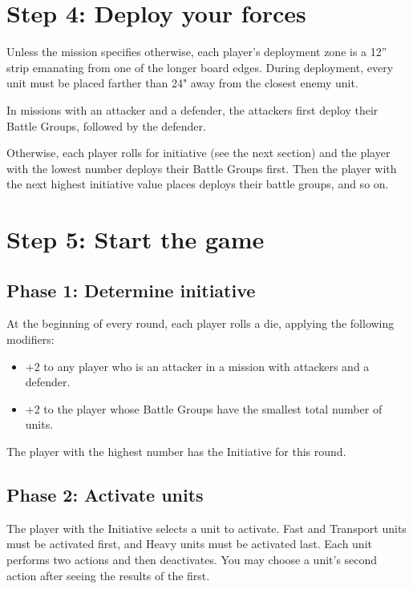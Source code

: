\begin{multicols}{2}
\section*{Step 4: Deploy your forces}
Unless the mission specifies otherwise, each player's deployment zone is a 12'' strip emanating from one of the longer board edges. During deployment, every unit must be placed farther than 24" away from the closest enemy unit.

In missions with an attacker and a defender, the attackers first deploy their Battle Groups, followed by the defender.

Otherwise, each player rolls for initiative (see the next section) and the player with the lowest number deploys their Battle Groups first. Then the player with the next highest initiative value places deploys their battle groups, and so on.




\section*{Step 5: Start the game}

\subsection*{Phase 1: Determine initiative}

At the beginning of every round, each player rolls a die, applying the following modifiers:
\begin{itemize}
    \item +2 to any player who is an attacker in a mission with attackers and a defender.
    \item +2 to the player whose Battle Groups have the smallest total number of units.
\end{itemize}

The player with the highest number has the Initiative for this round.


\subsection*{Phase 2: Activate units}

The player with the Initiative selects a unit to activate. Fast and Transport units must be activated first, and Heavy units must be activated last. Each unit performs two actions and then deactivates. You may choose a unit's second action after seeing the results of the first.


\end{multicols}
